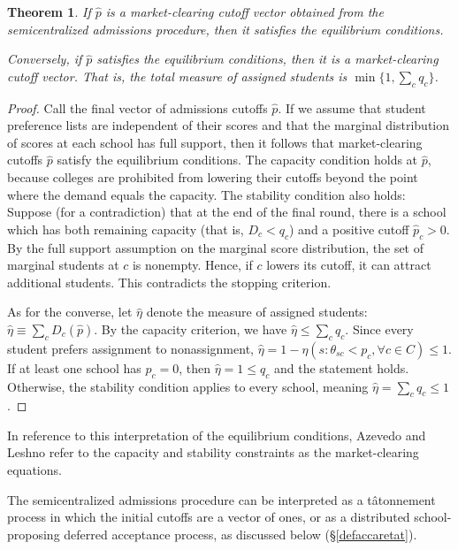 \documentclass[12pt]{article}
\newtheorem{theorem}{Theorem}
\theoremstyle{definition}
\begin{document}
\begin{theorem}
If $\hat p$ is a market-clearing cutoff vector obtained from the semicentralized admissions procedure, then it satisfies the equilibrium conditions.

Conversely, if $\hat p$ satisfies the equilibrium conditions, then it is a market-clearing cutoff vector. That is, the total measure of assigned students is $\min\{1, \sum_c q_c\}$. 
\end{theorem}

\begin{proof}Call the final vector of admissions cutoffs $\hat p$. If we assume that student preference lists are independent of their scores and that the marginal distribution of scores at each school has full support, then it follows that market-clearing cutoffs $\hat p$ satisfy the equilibrium conditions. The capacity condition holds at $\hat p$, because colleges are prohibited from lowering their cutoffs beyond the point where the demand equals the capacity. The stability condition also holds: Suppose (for a contradiction) that at the end of the final round, there is a school which has both remaining capacity (that is, $D_c < q_c$) and a positive cutoff $\hat p_c > 0$. By the full support assumption on the marginal score distribution, the set of marginal students at $c$ is nonempty. Hence, if $c$ lowers its cutoff, it can attract additional students. This contradicts the stopping criterion.

As for the converse, let $\hat \eta$ denote the measure of assigned students: $\hat \eta \equiv \sum_c D_c(\hat p)$. By the capacity criterion, we have $\hat \eta \leq \sum_c q_c$. Since every student prefers assignment to nonassignment, $\hat \eta = 1 - \eta ( s: \theta_{sc} < p_c, \forall c \in C) \leq 1$. If at least one school has $p_c = 0$, then $\hat \eta = 1 \leq q_c$ and the statement holds. Otherwise, the stability condition applies to every school, meaning $\hat \eta = \sum_c q_c \leq 1$ . 
\end{proof}

In reference to this interpretation of the equilibrium conditions, Azevedo and Leshno \parencite*{supplydemandfw} refer to the capacity and stability constraints as the market-clearing equations. 

The semicentralized admissions procedure can be interpreted as a t\^{a}tonnement process in which the initial cutoffs are a vector of ones, or as a distributed school-proposing deferred acceptance process, as discussed below (\S\ref{defaccaretat}).
\end{document}
